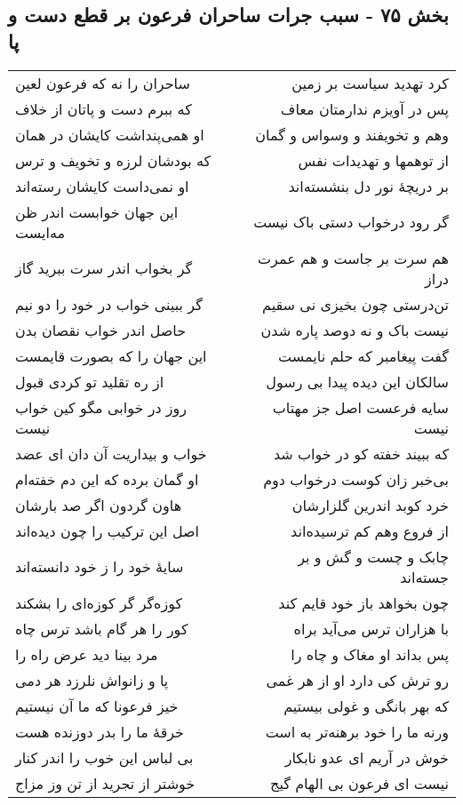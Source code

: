 \begin{center}
\section*{بخش ۷۵ - سبب جرات ساحران فرعون بر قطع دست و پا}
\label{sec:sh075}
\begin{longtable}{l p{0.5cm} r}
ساحران را نه که فرعون لعین
&&
کرد تهدید سیاست بر زمین
\\
که ببرم دست و پاتان از خلاف
&&
پس در آویزم ندارمتان معاف
\\
او همی‌پنداشت کایشان در همان
&&
وهم و تخویفند و وسواس و گمان
\\
که بودشان لرزه و تخویف و ترس
&&
از توهمها و تهدیدات نفس
\\
او نمی‌داست کایشان رسته‌اند
&&
بر دریچهٔ نور دل بنشسته‌اند
\\
این جهان خوابست اندر ظن مه‌ایست
&&
گر رود درخواب دستی باک نیست
\\
گر بخواب اندر سرت ببرید گاز
&&
هم سرت بر جاست و هم عمرت دراز
\\
گر ببینی خواب در خود را دو نیم
&&
تن‌درستی چون بخیزی نی سقیم
\\
حاصل اندر خواب نقصان بدن
&&
نیست باک و نه دوصد پاره شدن
\\
این جهان را که بصورت قایمست
&&
گفت پیغامبر که حلم نایمست
\\
از ره تقلید تو کردی قبول
&&
سالکان این دیده پیدا بی رسول
\\
روز در خوابی مگو کین خواب نیست
&&
سایه فرعست اصل جز مهتاب نیست
\\
خواب و بیداریت آن دان ای عضد
&&
که ببیند خفته کو در خواب شد
\\
او گمان برده که این دم خفته‌ام
&&
بی‌خبر زان کوست درخواب دوم
\\
هاون گردون اگر صد بارشان
&&
خرد کوبد اندرین گلزارشان
\\
اصل این ترکیب را چون دیده‌اند
&&
از فروع وهم کم ترسیده‌اند
\\
سایهٔ خود را ز خود دانسته‌اند
&&
چابک و چست و گش و بر جسته‌اند
\\
کوزه‌گر گر کوزه‌ای را بشکند
&&
چون بخواهد باز خود قایم کند
\\
کور را هر گام باشد ترس چاه
&&
با هزاران ترس می‌آید براه
\\
مرد بینا دید عرض راه را
&&
پس بداند او مغاک و چاه را
\\
پا و زانواش نلرزد هر دمی
&&
رو ترش کی دارد او از هر غمی
\\
خیز فرعونا که ما آن نیستیم
&&
که بهر بانگی و غولی بیستیم
\\
خرقهٔ ما را بدر دوزنده هست
&&
ورنه ما را خود برهنه‌تر به است
\\
بی لباس این خوب را اندر کنار
&&
خوش در آریم ای عدو نابکار
\\
خوشتر از تجرید از تن وز مزاج
&&
نیست ای فرعون بی الهام گیج
\\
\end{longtable}
\end{center}

